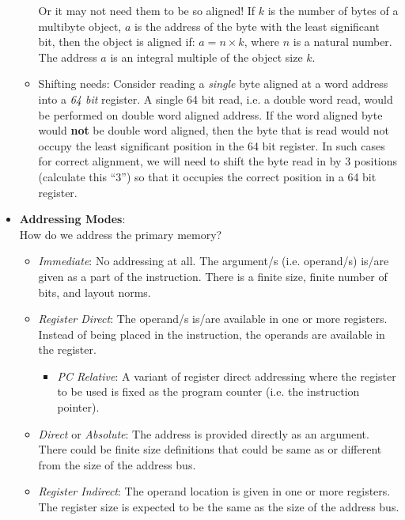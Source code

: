 \begin{itemize}
\begin{itemize}
    Or it may not need them to be so aligned!  If $k$ is the number of
    bytes of a  multibyte object, $a$ is the address  of the byte with
    the  least  significant  bit,  then  the  object  is  aligned  if:
    $a = n \times k$, where $n$  is a natural number.  The address $a$
    is an integral multiple of the object size $k$.
  \item Shifting needs: Consider  reading a \emph{single} byte aligned
    at a word address into a  \emph{64 bit} register.  A single 64 bit
    read, i.e. a  double word read, would be performed  on double word
    aligned address.  If  the word aligned byte  would \textbf{not} be
    double word aligned,  then the byte that is read  would not occupy
    the least  significant position in  the 64 bit register.   In such
    cases for correct  alignment, we will need to shift  the byte read
    in by 3  positions (calculate this ``3'') so that  it occupies the
    correct position in a 64 bit register.
  \end{itemize}
\item \textbf{Addressing Modes}: \\
  How do we address the primary memory?
  \begin{itemize}
  \item  \emph{Immediate}:  No  addressing  at  all.   The  argument/s
    (i.e. operand/s) is/are given as a part of the instruction.  There
    is a finite size, finite number of bits, and layout norms.
  \item \emph{Register Direct}: The  operand/s is/are available in one
    or more  registers.  Instead of  being placed in  the instruction,
    the operands are available in the register.
    \begin{itemize}
    \item \emph{PC Relative}: A  variant of register direct addressing
      where the  register to be used  is fixed as the  program counter
      (i.e.  the instruction pointer).
    \end{itemize}
  \item  \emph{Direct} or  \emph{Absolute}:  The  address is  provided
    directly as an  argument.  There could be  finite size definitions
    that could  be same as or  different from the size  of the address
    bus.
  \item \emph{Register Indirect}: The operand location is given in one
    or more registers.   The register size is expected to  be the same
    as the size of the address bus.
    \begin{itemize}

\end{itemize}
\end{itemize}
\end{itemize}
